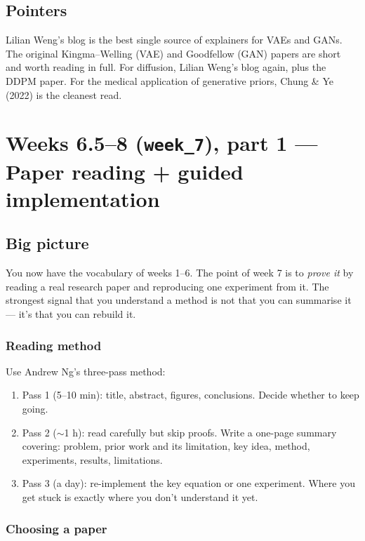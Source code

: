 \documentclass[11pt,a4paper]{article}
\begin{document}
\subsection{Pointers}

Lilian Weng's blog is the best single source of explainers for VAEs
and GANs. The original Kingma--Welling (VAE) and Goodfellow (GAN)
papers are short and worth reading in full. For diffusion, Lilian
Weng's blog again, plus the DDPM paper. For the medical application
of generative priors, Chung \& Ye (2022) is the cleanest read.

\section{Weeks 6.5--8 (\texttt{week\_7}), part 1 --- Paper reading + guided implementation}

\subsection{Big picture}

You now have the vocabulary of weeks 1--6. The point of week 7 is to
\emph{prove it} by reading a real research paper and reproducing
one experiment from it. The strongest signal that you understand a
method is not that you can summarise it --- it's that you can rebuild
it.

\subsubsection{Reading method}

Use Andrew Ng's three-pass method:
\begin{enumerate}[nosep, leftmargin=*]
  \item Pass 1 (5--10 min): title, abstract, figures, conclusions.
        Decide whether to keep going.
  \item Pass 2 ($\sim$1 h): read carefully but skip proofs. Write a
        one-page summary covering: problem, prior work and its
        limitation, key idea, method, experiments, results,
        limitations.
  \item Pass 3 (a day): re-implement the key equation or one
        experiment. Where you get stuck is exactly where you don't
        understand it yet.
\end{enumerate}

\subsubsection{Choosing a paper}
\end{document}
